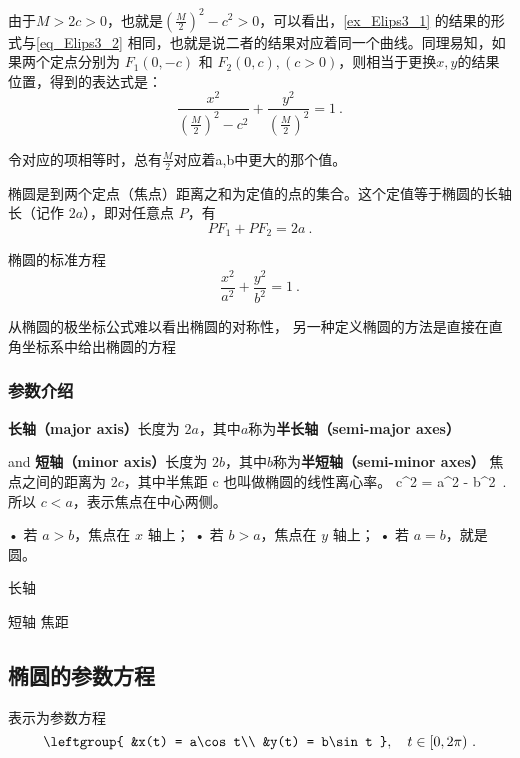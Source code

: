 由于$M>2c>0$，也就是$\displaystyle\left(\frac{M}{2}\right)^2-c^2>0$，可以看出，\autoref{ex_Elips3_1} 的结果的形式与\autoref{eq_Elips3_2} 相同，也就是说二者的结果对应着同一个曲线。同理易知，如果两个定点分别为 $F_1(0,-c)$ 和 $F_2(0,c),(c>0)$，则相当于更换$x,y$的结果位置，得到的表达式是：
\begin{equation}
\frac{x^2}{\displaystyle\left(\frac{M}{2}\right)^2-c^2}+\frac{y^2}{\left(\displaystyle\frac{M}{2}\right)^2} =1~.
\end{equation}

令对应的项相等时，总有$\displaystyle\frac{M}{2}$对应着a,b中更大的那个值。

椭圆是到两个定点（焦点）距离之和为定值的点的集合。这个定值等于椭圆的长轴长（记作 $2a$），即对任意点 $P$，有
\begin{equation}\label{eq_Elips3_9}
PF_1 + PF_2 = 2a ~.
\end{equation}

\begin{definition}{椭圆的标准方程}
\begin{equation}\label{eq_Elips3_3}
\frac{x^2}{a^2} + \frac{y^2}{b^2} = 1~.
\end{equation}
\end{definition}

从椭圆的极坐标公式难以看出椭圆的对称性， 另一种定义椭圆的方法是直接在直角坐标系中给出椭圆的方程

\subsubsection{参数介绍}

\textbf{长轴（major axis）}长度为 $2a$，其中$a$称为\textbf{半长轴（semi-major axes）}

and 
\textbf{短轴（minor axis）}长度为 $2b$，其中$b$称为\textbf{半短轴（semi-minor axes）}
焦点之间的距离为 $2c$，其中半焦距 c 也叫做椭圆的线性离心率。
 c^2 = a^2 - b^2~. 
所以 $c < a$，表示焦点在中心两侧。

	•	若 $a > b$，焦点在 $x$ 轴上；
	•	若 $b > a$，焦点在 $y$ 轴上；
	•	若 $a = b$，就是圆。


长轴

短轴
焦距

\subsection{椭圆的参数方程}
表示为参数方程
\begin{equation}\label{eq_Elips3_1}
\leftgroup{
&x(t) = a\cos t\\
&y(t) = b\sin t
},\quad t \in [0, 2\pi) ~.
\end{equation}
